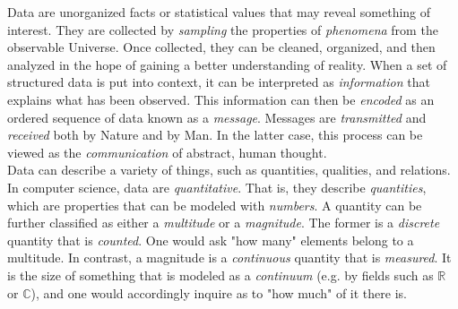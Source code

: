 




Data are unorganized facts or statistical values that may reveal something of interest. They are collected by \textit{sampling} the properties of \textit{phenomena} from the observable Universe. Once collected, they can be cleaned, organized, and then analyzed in the hope of gaining a better understanding of reality. When a set of structured data is put into context, it can be interpreted as \textit{information} that explains what has been observed. This information can then be \textit{encoded} as an ordered sequence of data known as a \textit{message}. Messages are \textit{transmitted} and \textit{received} both by Nature and by Man. In the latter case, this process can be viewed as the \textit{communication} of abstract, human thought. \\

Data can describe a variety of things, such as quantities, qualities, and relations. In computer science, data are \textit{quantitative}. That is, they describe \textit{quantities}, which are properties that can be modeled with \textit{numbers}. A quantity can be further classified as either a \textit{multitude} or a \textit{magnitude}. The former is a \textit{discrete} quantity that is \textit{counted}. One would ask "how many" elements belong to a multitude. In contrast, a magnitude is a \textit{continuous} quantity that is \textit{measured}. It is the size of something that is modeled as a \textit{continuum} (e.g. by fields such as $\mathbb{R}$ or $\mathbb{C}$), and one would accordingly inquire as to "how much" of it there is. \\

